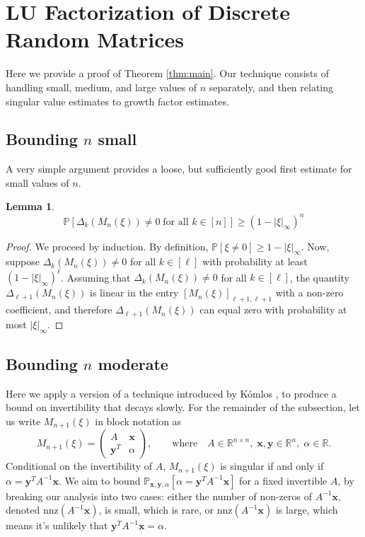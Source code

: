 \documentclass[reqno]{amsart}
\numberwithin{equation}{section}
\renewcommand\P{\mathbb{P}}
\newtheorem{lemma}[theorem]{Lemma}
\begin{document}
\section{LU Factorization of Discrete Random Matrices}\label{sec:main_thm}
Here we provide a proof of Theorem \ref{thm:main}. Our technique consists of handling small, medium, and large values of $n$ separately, and then relating singular value estimates to growth factor estimates.

\subsection{Bounding $n$ small} A very simple argument provides a loose, but sufficiently good first estimate for small values of $n$.

\begin{lemma}\label{lm:simple}
\[\mathbb{P}\left[\Delta_{k}(M_n(\xi)) \ne 0 \; \text{for all } k \in [n] \right] \ge (1 - |\xi|_\infty)^n\]
\end{lemma}

\begin{proof}
    We proceed by induction. By definition, $\P[\xi \ne 0] \ge 1- |\xi|_\infty$. Now, suppose $\Delta_k(M_n(\xi)) \ne 0$ for all $k \in [\ell]$ with probability at least $(1-|\xi|_\infty)^{\ell}$. Assuming that $\Delta_k(M_n(\xi)) \ne 0$ for all $k \in [\ell]$, the quantity $\Delta_{\ell+1}(M_n(\xi))$ is linear in the entry $[M_n(\xi)]_{\ell+1,\ell+1}$ with a non-zero coefficient, and therefore  $\Delta_{\ell+1}(M_n(\xi))$ can equal zero with probability at most $|\xi|_\infty$.
\end{proof}

\subsection{Bounding $n$ moderate}\label{sub:n_moderate} Here we apply a version of a technique introduced by K{\'o}mlos \cite{komlos1967determinant}, to produce a bound on invertibility that decays slowly. For the remainder of the subsection, let us write $M_{n+1}(\xi)$ in block notation as
\[M_{n+1}(\xi) = \begin{pmatrix} A & \bm{x} \\ \bm{y}^T & \alpha \end{pmatrix}, \qquad \text{where} \quad A \in \mathbb{R}^{n \times n},\; \bm{x}, \bm{y} \in \mathbb{R}^{n}, \; \alpha \in \mathbb{R}. \]
Conditional on the invertibility of $A$, $M_{n+1}(\xi)$ is singular if and only if $\alpha = \bm{y}^T A^{-1} \bm{x}$. We aim to bound $\mathbb{P}_{\bm{x},\bm{y},\alpha}\left[\alpha = \bm{y}^TA^{-1} \bm{x} \right]$ for a fixed invertible $A$, by breaking our analysis into two cases: either the number of non-zeros of $A^{-1} \bm{x}$, denoted $\mathrm{nnz}(A^{-1} \bm{x})$, is small, which is rare, or $\mathrm{nnz}(A^{-1} \bm{x})$ is large, which means it's unlikely that $\bm{y}^TA^{-1} \bm{x} = \alpha$. 
\end{document}
